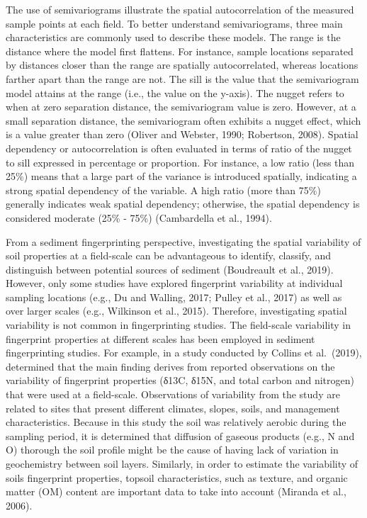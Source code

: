 \documentclass[
  number]{elsarticle}
\begin{document}
The use of semivariograms illustrate the spatial autocorrelation of the
measured sample points at each field. To better understand
semivariograms, three main characteristics are commonly used to describe
these models. The range is the distance where the model first flattens.
For instance, sample locations separated by distances closer than the
range are spatially autocorrelated, whereas locations farther apart than
the range are not. The sill is the value that the semivariogram model
attains at the range (i.e., the value on the y-axis). The nugget refers
to when at zero separation distance, the semivariogram value is zero.
However, at a small separation distance, the semivariogram often
exhibits a nugget effect, which is a value greater than zero (Oliver and
Webster, 1990; Robertson, 2008). Spatial dependency or autocorrelation
is often evaluated in terms of ratio of the nugget to sill expressed in
percentage or proportion. For instance, a low ratio (less than 25\%)
means that a large part of the variance is introduced spatially,
indicating a strong spatial dependency of the variable. A high ratio
(more than 75\%) generally indicates weak spatial dependency; otherwise,
the spatial dependency is considered moderate (25\% - 75\%) (Cambardella
et al., 1994).

From a sediment fingerprinting perspective, investigating the spatial
variability of soil properties at a field-scale can be advantageous to
identify, classify, and distinguish between potential sources of
sediment (Boudreault et al., 2019). However, only some studies have
explored fingerprint variability at individual sampling locations (e.g.,
Du and Walling, 2017; Pulley et al., 2017) as well as over larger scales
(e.g., Wilkinson et al., 2015). Therefore, investigating spatial
variability is not common in fingerprinting studies. The field-scale
variability in fingerprint properties at different scales has been
employed in sediment fingerprinting studies. For example, in a study
conducted by Collins et al.~(2019), determined that the main finding
derives from reported observations on the variability of fingerprint
properties (δ13C, δ15N, and total carbon and nitrogen) that were used at
a field-scale. Observations of variability from the study are related to
sites that present different climates, slopes, soils, and management
characteristics. Because in this study the soil was relatively aerobic
during the sampling period, it is determined that diffusion of gaseous
products (e.g., N and O) thorough the soil profile might be the cause of
having lack of variation in geochemistry between soil layers. Similarly,
in order to estimate the variability of soils fingerprint properties,
topsoil characteristics, such as texture, and organic matter (OM)
content are important data to take into account (Miranda et al., 2006).
\end{document}
